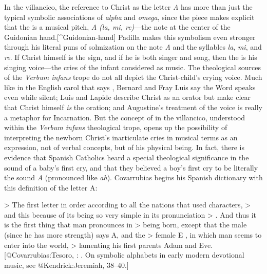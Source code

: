 In the villancico, the reference to Christ as the letter \emph{A} has more than just
the typical symbolic associations of \emph{alpha} and \emph{omega}, since the piece makes
explicit that the  is a musical pitch, \emph{A (la, mi, re)}---the note at the
center of the Guidonian hand.[^Guidonian-hand]
Padilla makes this symbolism even stronger through his literal puns of
solmization on the note \emph{A} and the syllables \emph{la}, \emph{mi}, and \emph{re}.
If Christ himself is the sign, and if he is both singer and song, then the  is his singing voice---the cries of the infant considered as music.
The theological sources of the \emph{Verbum infans} trope do not all depict the
Christ-child's crying voice.
Much like in the English carol that says , Bernard and Fray Luis say the Word speaks even while silent; Luis
and Lapide describe Christ as an orator but make clear that Christ himself \emph{is}
the oration; and Augustine's treatment of the voice is really a metaphor for
Incarnation.
But the concept of  in the villancico, understood within the
\emph{Verbum infans} theological trope, opens up the possibility of interpreting the
newborn Christ's inarticulate cries in musical terms as an expression, not of
verbal concepts, but of his physical being.
In fact, there is evidence that Spanish Catholics heard a special theological
significance in the sound of a baby's first cry, and that they believed a boy's
first cry to be literally the sound \emph{A} (pronounced like \emph{ah}).
Covarrubias begins his Spanish dictionary with this definition of the letter A:

> The first letter in order according to all the nations that used characters,
> \Dots{} and this because of its being so very simple in its pronunciation
> . \Dots{} And thus it is the first thing that man pronounces in
> being born, except that the male (since he has more strength) says A, and the
> female E , in which man seems to enter into the world,
> lamenting his first parents Adam and Eve.
[@Covarrubias:Tesoro, :
. 
On symbolic alphabets in early modern devotional music, see @Kendrick:Jeremiah,
38--40.]

